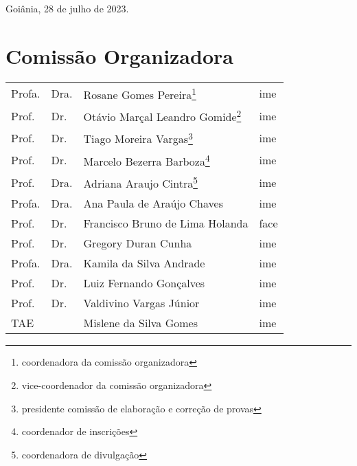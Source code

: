 \documentclass[a4paper,12pt]{article}
\def\year{2023}
\begin{document}
Goiânia, 28 de julho de \year.

\section*{Comissão Organizadora}

\begin{table}[H]
  \centering
  \begin{tabular}{llll}
    Profa. & Dra. & Rosane Gomes Pereira\footnote{coordenadora da comissão organizadora}                  & \acrshort{ime}  \\
    Prof.  & Dr.  & Otávio Marçal Leandro Gomide\footnote{vice-coordenador da comissão organizadora}      & \acrshort{ime}  \\
    Prof.  & Dr.  & Tiago Moreira Vargas\footnote{presidente comissão de elaboração e correção de provas} & \acrshort{ime}  \\
    Prof.  & Dr.  & Marcelo Bezerra Barboza\footnote{coordenador de inscrições}                           & \acrshort{ime}  \\
    Prof.  & Dra. & Adriana Araujo Cintra\footnote{coordenadora de divulgação}                            & \acrshort{ime}  \\
    Profa. & Dra. & Ana Paula de Araújo Chaves                                                            & \acrshort{ime}  \\
    Prof.  & Dr.  & Francisco Bruno de Lima Holanda                                                       & \acrshort{face} \\
    Prof.  & Dr.  & Gregory Duran Cunha                                                                   & \acrshort{ime}  \\
    Profa. & Dra. & Kamila da Silva Andrade                                                               & \acrshort{ime}  \\
    Prof.  & Dr.  & Luiz Fernando Gonçalves                                                               & \acrshort{ime}  \\
    Prof.  & Dr.  & Valdivino Vargas Júnior                                                               & \acrshort{ime}  \\
    TAE    &      & Mislene da Silva Gomes                                                                & \acrshort{ime}
  \end{tabular}
\end{table}
\end{document}

